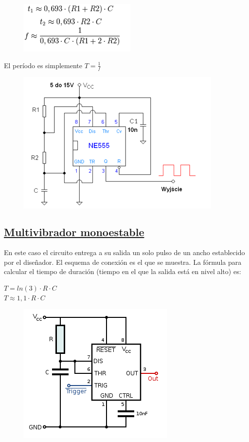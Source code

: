 \documentclass[a4paper,11pt]{article}
\begin{document}
	\begin{figure}[h]
		\centering
		\includegraphics[width=0.7\linewidth]{./7a}
	\end{figure}

El período es simplemente $T = \frac{1}{f}$

	\begin{figure}[h]
		\centering
		\includegraphics[width=0.7\linewidth]{./7}
	\end{figure}

\subsection{\underline{Multivibrador monoestable}}
En este caso el circuito entrega a su salida un solo pulso de un ancho establecido por el diseñador.
El esquema de conexión es el que se muestra. La fórmula para calcular el tiempo de duración (tiempo en el que la salida está en nivel alto) es:

$T = ln(3)\cdot R \cdot C$ \\ 
$T \approx 1,1 \cdot R \cdot C$

	\begin{figure}[h]
		\centering
		\includegraphics[width=0.7\linewidth]{./8}
	\end{figure}
	
\end{document}
